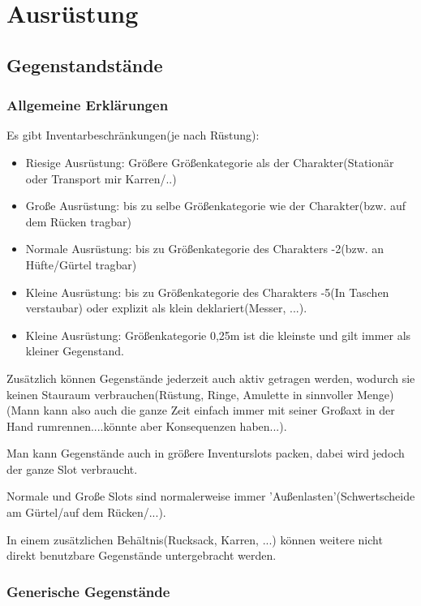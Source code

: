 \part{Ausrüstung}
\chapter{Gegenstandstände}
\section{Allgemeine Erklärungen}
Es gibt Inventarbeschränkungen(je nach Rüstung):
\begin{itemize}
\item Riesige Ausrüstung: Größere Größenkategorie als der Charakter(Stationär oder Transport mir Karren/..)
\item Große Ausrüstung: bis zu selbe Größenkategorie wie der Charakter(bzw. auf dem Rücken tragbar)
\item Normale Ausrüstung: bis zu Größenkategorie des Charakters -2(bzw. an Hüfte/Gürtel tragbar)
\item Kleine Ausrüstung: bis zu Größenkategorie des Charakters -5(In Taschen verstaubar) oder explizit als klein deklariert(Messer, ...).
\item Kleine Ausrüstung: Größenkategorie 0,25m ist die kleinste und gilt immer als kleiner Gegenstand.
\end{itemize}
Zusätzlich können Gegenstände jederzeit auch aktiv getragen werden, wodurch sie keinen Stauraum verbrauchen(Rüstung, Ringe, Amulette in sinnvoller Menge)(Mann kann also auch die ganze Zeit einfach immer mit seiner Großaxt in der Hand rumrennen....könnte aber Konsequenzen haben...).

Man kann Gegenstände auch in größere Inventurslots packen, dabei wird jedoch der ganze Slot verbraucht.

Normale und Große Slots sind normalerweise immer 'Außenlasten'(Schwertscheide am Gürtel/auf dem Rücken/...).

In einem zusätzlichen Behältnis(Rucksack, Karren, ...) können weitere nicht direkt benutzbare Gegenstände untergebracht werden.
\section{Generische Gegenstände}
